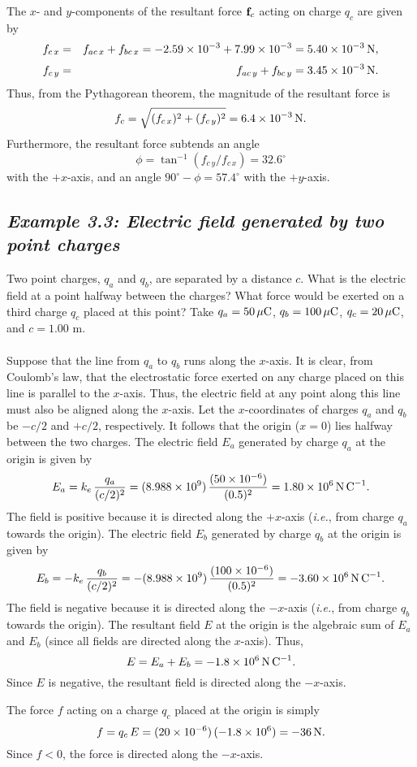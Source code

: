 The $x$- and $y$-components of the resultant force ${\bf f}_c$ acting on charge $q_c$ are given by
\begin{eqnarray}
f_{c\,x} &=&f_{ac\,x} + f_{bc\,x} =  -2.59\times 10^{-3} +  7.99 \times 10^{-3} =5.40\times 
10^{-3}\,{\rm N},\nonumber\\[0.5ex]
f_{c\,y} &=& f_{ac\,y} + f_{bc\,y} = 3.45 \times 10^{-3}\,{\rm N}.\nonumber
\end{eqnarray}
Thus, from the Pythagorean theorem, the magnitude of the resultant force is
$$
f_c = \sqrt{(f_{c\,x})^2 + (f_{c\,y})^2} = 6.4\times 10^{-3}\,{\rm N}.
$$
Furthermore, the resultant force subtends an
angle
$$
\phi = \tan^{-1} (f_{c\,y}/f_{c\,x}) = 32.6^\circ
$$
with the $+x$-axis, and an angle $90^\circ-\phi = 57.4^\circ$ with the $+y$-axis.

\subsection*{\em Example 3.3: Electric field generated by two point charges}
\begin{figure*}[h]
\epsfysize=1in
\centerline{}
\end{figure*}
 Two point charges, $q_a$ and $q_b$, are separated by a distance
$c$. What is the electric field at a point halfway between the charges? 
What force would be exerted on a third charge $q_c$ placed at this point?
Take $q_a=50\,\mu{\rm C}$, $q_b = 100\,\mu{\rm C}$, $q_c=20\,\mu{\rm C}$,
and $c=1.00$ m.\\
~\\
 Suppose that the line from $q_a$ to $q_b$ runs along
the $x$-axis. It is clear, from Coulomb's law, that the electrostatic
force exerted on any charge placed on this line is parallel to the $x$-axis.
Thus, the electric field at any point along  this line must also be aligned
along the $x$-axis. Let the $x$-coordinates of charges $q_a$ and $q_b$ be $-c/2$ and $+c/2$,
respectively. It follows that the origin ($x=0$) lies
halfway between the two charges. The electric field $E_a$ generated by charge $q_a$ at the
origin is given by
$$
E_a = k_e\,\frac{q_a}{(c/2)^2} = (8.988\times 10^9)\, \frac{(50\times 10^{-6})}{(0.5)^2}
= 1.80\times 10^6\,{\rm N\,C}^{-1}.
$$
The field is positive because it is directed along the $+x$-axis ({\em i.e.}, from
charge $q_a$ towards the origin). The electric field $E_b$ generated by charge $q_b$ at the
origin is given by
$$
E_b = -k_e\,\frac{q_b}{(c/2)^2} = -(8.988\times 10^9) \,\frac{(100\times 10^{-6})}{(0.5)^2}
= -3.60\times 10^6\,{\rm N\,C}^{-1}.
$$
The field is negative  because it is directed along the $-x$-axis ({\em i.e.}, from
charge $q_b$ towards the origin). The resultant field $E$ at the origin is the
algebraic sum  of $E_a$ and $E_b$ (since all fields are directed along the $x$-axis).
Thus,
$$
E = E_a + E_b =  -1.8 \times 10^6\,{\rm N\,C}^{-1}.
$$
Since $E$ is negative, the resultant field is directed along the $-x$-axis.

The force $f$ acting on a charge $q_c$ placed at the origin is simply
$$
f = q_c\,E = (20\times 10^{-6})\,(-1.8\times 10^6)=-36 \,{\rm N}.
$$
Since $f<0$, the force is directed along the $-x$-axis.


